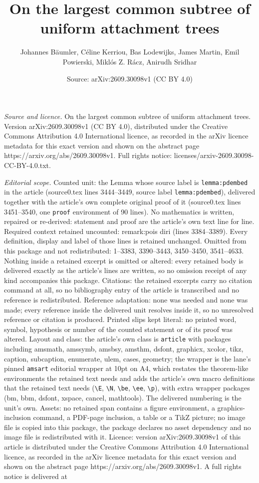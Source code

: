 \documentclass[10pt,a4paper]{amsart}
\title[On the largest common subtree of uniform attachment trees]{On the largest common subtree of uniform attachment trees}
\author{Johannes B\"aumler, C\'eline Kerriou, Bas Lodewijks, James Martin, Emil Powierski, Mikl\'os Z. R\'acz, Anirudh Sridhar}
\date{Source: arXiv:2609.30098v1 (CC BY 4.0)}
\begin{document}
\maketitle

\noindent\emph{Source and licence.} On the largest common subtree of uniform attachment trees. Version arXiv:2609.30098v1 (CC BY 4.0), distributed under the Creative Commons Attribution 4.0 International licence, as recorded in the arXiv licence metadata for this exact version and shown on the abstract page https://arxiv.org/abs/2609.30098v1. Full rights notice: licenses/arxiv-2609.30098-CC-BY-4.0.txt.\par\smallskip

\noindent\textit{Editorial scope.} Counted unit: the Lemma whose source label is \texttt{lemma:pdembed} in the article (source0.tex lines 3444--3449, source label \texttt{lemma:pdembed}), delivered together with the article's own complete original proof of it (source0.tex lines 3451--3540, one \texttt{proof} environment of 90 lines). No mathematics is written, repaired or re-derived: statement and proof are the article's own text line for line. Required context retained uncounted: remark:pois diri (lines 3384--3389). Every definition, display and label of those lines is retained unchanged. Omitted from this package and not redistributed: 1--3383, 3390--3443, 3450--3450, 3541--4633. Nothing inside a retained excerpt is omitted or altered: every retained body is delivered exactly as the article's lines are written, so no omission receipt of any kind accompanies this package. Citations: the retained excerpts carry no citation command at all, so no bibliography entry of the article is transcribed and no reference is redistributed. Reference adaptation: none was needed and none was made; every reference inside the delivered unit resolves inside it, so no unresolved reference or citation is produced. Printed slips kept literal: no printed word, symbol, hypothesis or number of the counted statement or of its proof was altered. Layout and class: the article's own class is \texttt{article} with packages including amsmath, amssymb, amsbsy, amsthm, dsfont, graphicx, xcolor, tikz, caption, subcaption, enumerate, ulem, cases, geometry; the wrapper is the lane's pinned \texttt{amsart} editorial wrapper at 10pt on A4, which restates the theorem-like environments the retained text needs and adds the article's own macro definitions that the retained text needs (\texttt{\textbackslash E}, \texttt{\textbackslash N}, \texttt{\textbackslash be}, \texttt{\textbackslash ee}, \texttt{\textbackslash p}), with extra wrapper packages (bm, bbm, dsfont, xspace, cancel, mathtools). The delivered numbering is the unit's own. Assets: no retained span contains a figure environment, a graphics-inclusion command, a PDF-page inclusion, a table or a TikZ picture; no image file is copied into this package, the package declares no asset dependency and no image file is redistributed with it. Licence: version arXiv:2609.30098v1 of this article is distributed under the Creative Commons Attribution 4.0 International licence, as recorded in the arXiv licence metadata for this exact version and shown on the abstract page https://arxiv.org/abs/2609.30098v1. A full rights notice is delivered at 
\end{document}

